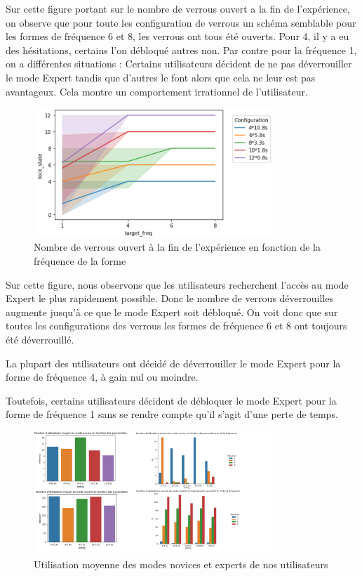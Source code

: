 \documentclass[a4paper, 12pt]{report}
\begin{document}
        Sur cette figure portant sur le nombre de verrous ouvert a la fin de l'expérience, on observe que pour toute les configuration de verrous un schéma semblable pour les formes de fréquence 6 et 8, les verrous ont tous été ouverts. 
        Pour 4, il y a eu des hésitations, certains l'on débloqué autres non.
        Par contre pour la fréquence 1, on a différentes situations : Certains utilisateurs décident
        de ne pas déverrouiller le mode Expert tandis que d'autres le font alors que cela ne leur est pas avantageux.
        Cela montre un comportement irrationnel de l'utilisateur.
        
        \begin{figure}[H]
            \centering
            \includegraphics[width=0.8\textwidth]{img/fig8.png}
            \caption{Nombre de verrous ouvert à la fin de l'expérience en fonction de la fréquence de la forme}
        \end{figure}
        
        Sur cette figure, nous observons que les utilisateurs recherchent l'accès au mode Expert le
        plus rapidement possible. Donc le nombre de verrous déverrouilles augmente jusqu'à ce que
        le mode Expert soit débloqué. On voit donc que sur toutes les configurations des verrous
        les formes de fréquence 6 et 8 ont toujours été déverrouillé. 
        
        La plupart des utilisateurs ont décidé de déverrouiller le mode Expert pour la forme de fréquence 
        4, à gain nul ou moindre. 
        
        Toutefois, certains utilisateurs décident de débloquer le mode Expert pour la forme de fréquence 1 
        sans se rendre compte qu'il s'agit d'une perte de temps.
        
        \begin{figure}[H]
            \centering
            \includegraphics[width=0.8\textwidth]{img/fig9.png}
            \caption{Utilisation moyenne des modes novices et experts de nos utilisateurs}
        \end{figure}
        
\end{document}
